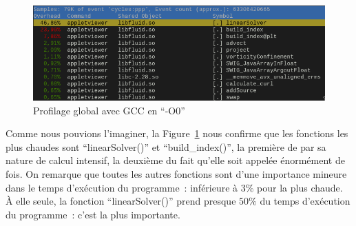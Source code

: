 \documentclass[12pt,a4paper]{article}
\begin{document}
\begin{figure}[h]
    \centering
    \includegraphics[scale=0.62]{figures/optims/gcc-O0/global.png}
    \caption{Profilage global avec \ac{GCC} en \enquote{-O0}}
    \label{fig.optim.global}
\end{figure}

Comme nous pouvions l’imaginer, la Figure~\ref{fig.optim.global} nous confirme
que les fonctions les plus chaudes sont \enquote{linearSolver()} et
\enquote{build\_index()}, la première de par sa nature de calcul intensif, la
deuxième du fait qu’elle soit appelée énormément de fois. On remarque que toutes
les autres fonctions sont d’une importance mineure dans le temps d’exécution du
programme : inférieure à $3\%$ pour la plus chaude. À elle seule, la fonction
\enquote{linearSolver()} prend presque $50\%$ du temps d’exécution du
programme : c’est la plus importante.
\end{document}
